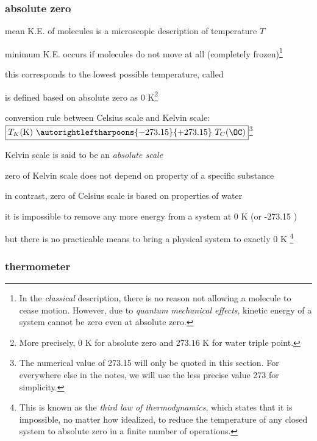 \subsubsection{absolute zero}\label{s-abs-zero}

mean K.E. of molecules is a microscopic description of temperature $T$

minimum K.E. occurs if molecules do not move at all (completely frozen)\footnote{In the \emph{classical} description, there is no reason not allowing a molecule to cease motion. However, due to \emph{quantum mechanical effects}, kinetic energy of a system cannot be zero even at absolute zero.}

this corresponds to the lowest possible temperature, called 

\cmt {} is defined based on absolute zero as 0 K\footnote{More precisely, 0 K for absolute zero  and $273.16\text{ K}$ for water triple point.}

\cmt conversion rule between Celsius scale and Kelvin scale: $\boxed{T_K (\text{K}) \text{ } \autorightleftharpoons{\footnotesize -273.15}{\footnotesize +273.15} \text{ } T_C (\OC)}$\footnote{The numerical value of 273.15 will only be quoted in this section. For everywhere else in the notes, we will use the less precise value 273 for simplicity.}

\cmt Kelvin scale is said to be an \emph{absolute scale}

zero of Kelvin scale does not depend on property of a specific substance

in contrast, zero of Celsius scale is based on properties of water

\cmt it is impossible to remove any more energy from a system at 0 K (or -273.15 \OC)

but there is no practicable means to bring a physical system to exactly $0\text{ K}$
\footnote{This is known as the \emph{third law of thermodynamics}, which states that it is impossible, no matter how idealized, to reduce the temperature of any closed system to absolute zero in a finite number of operations.}




\subsubsection{thermometer}

